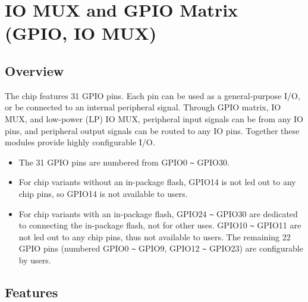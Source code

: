 \documentclass[main\_\_EN.tex]{subfiles}
\begin{document}

\ifglobal
\else
    {\let\clearpage\relax \listoftodos}
    {\let\clearpage\relax \listofdonetodos}
    \tableofcontents
    \listoftables
    \listoffigures
\fi


\hypertarget{iomuxgpio}{}
\chapter{IO MUX and GPIO Matrix (GPIO, IO MUX)}
\label{mod:iomuxgpio}

\section{Overview}

The \chipname{} chip features 31 GPIO pins. Each pin can be used as a general-purpose I/O, or be connected to an internal peripheral signal. Through GPIO matrix, IO MUX, and low-power (LP) IO MUX, peripheral input signals can be from any IO pins, and peripheral output signals can be routed to any IO pins. Together these modules provide highly configurable I/O.

\begin{tiplisting}
\vspace{-2em}
\begin{itemize}
\item The 31 GPIO pins are numbered from GPIO0 \verb+~+ GPIO30.
\item For chip variants without an in-package flash, GPIO14 is not led out to any chip pins, so GPIO14 is not available to users.
\item For chip variants with an in-package flash, GPIO24 \verb+~+ GPIO30 are dedicated to connecting the in-package flash, not for other uses. GPIO10 \verb+~+ GPIO11 are not led out to any chip pins, thus not available to users. The remaining 22 GPIO pins (numbered GPIO0 \verb+~+ GPIO9, GPIO12 \verb+~+ GPIO23) are configurable by users.
\end{itemize}
\end{tiplisting}

\section{Features}
\end{document}
